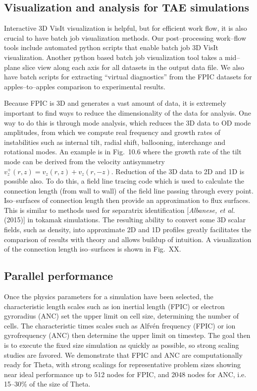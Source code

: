 \documentclass[a4paper,openany,12pt]{book}
\begin{document}
\subsection*{Visualization and analysis for TAE simulations}

Interactive 3D VisIt visualization is helpful, but for efficient work flow, it is also crucial to have batch job visualization methods. Our post--processing work--flow tools include automated python scripts that enable batch job 3D VisIt visualization. Another python based batch job visualization tool takes a mid--plane slice view along each axis for all datasets in the output data file. We also have batch scripts for extracting ``virtual diagnostics'' from the FPIC datasets for apples--to--apples comparison to experimental results.

Because FPIC is 3D and generates a vast amount of data, it is extremely important to find ways to reduce the dimensionality of the data for analysis. One way to do this is through mode analysis, which reduces the 3D data to OD mode amplitudes, from which we compute real frequency and growth rates of instabilities such as internal tilt, radial shift, ballooning, interchange and rotational modes. An example is in Fig.~10.6 where the growth rate of the tilt mode can be derived from the velocity antisymmetry $v_z^+(r, z)=v_z(r, z)+v_z(r, -z)$. Reduction of the 3D data to 2D and 1D is possible also. To do this, a field line tracing code which is used to calculate the connection length (from wall to wall) of the field line passing through every point. Iso--surfaces of connection length then provide an approximation to flux surfaces. This is similar to methods used for separatrix identification [\emph{Albanese, et al.} (2015)] in tokamak simulations. The resulting ability to convert some 3D scalar fields, such as density, into approximate 2D and 1D profiles greatly facilitates the comparison of results with theory and allows buildup of intuition. A visualization of the connection length iso--surfaces is shown in Fig.~XX. 

\subsection*{Parallel performance}

Once the physics parameters for a simulation have been selected, the characteristic length scales such as ion inertial length (FPIC) or electron gyroradius (ANC) set the upper limit on cell size, determining the number of cells. The characteristic times scales such as Alfv\'en frequency (FPIC) or ion gyrofrequency (ANC) then determine the upper limit on timestep. The goal then is to execute the fixed size simulation as quickly as possible, so strong scaling studies are favored. We demonstrate that FPIC and ANC are computationally ready for Theta, with strong scalings for representative problem sizes showing near ideal performance up to 512 nodes for FPIC, and 2048 nodes for ANC, i.e. 15--30\% of the size of Theta.
\end{document}
